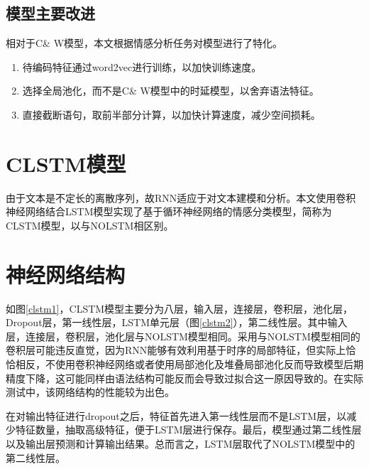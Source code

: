 \subsection{模型主要改进}
相对于C\& W模型，本文根据情感分析任务对模型进行了特化。
\begin{enumerate}
\item 待编码特征通过word2vec进行训练，以加快训练速度。
\item 选择全局池化，而不是C\& W模型中的时延模型，以舍弃语法特征。
\item 直接截断语句，取前半部分计算，以加快计算速度，减少空间损耗。
\end{enumerate}
\section{CLSTM模型}
由于文本是不定长的离散序列，故RNN适应于对文本建模和分析。本文使用卷积神经网络结合LSTM模型实现了基于循环神经网络的情感分类模型，简称为CLSTM模型，以与NOLSTM相区别。
\section{神经网络结构}
如图\ref{clstm1}，CLSTM模型主要分为八层，输入层，连接层，卷积层，池化层，Dropout层，第一线性层，LSTM单元层（图\ref{clstm2}），第二线性层。其中输入层，连接层，卷积层，池化层与NOLSTM模型相同。采用与NOLSTM模型相同的卷积层可能违反直觉，因为RNN能够有效利用基于时序的局部特征，但实际上恰恰相反，不使用卷积神经网络或者使用局部池化及堆叠局部池化反而导致模型后期精度下降，这可能同样由语法结构可能反而会导致过拟合这一原因导致的。在实际测试中，该网络结构的性能较为出色。\par
在对输出特征进行dropout之后，特征首先进入第一线性层而不是LSTM层，以减少特征数量，抽取高级特征，便于LSTM层进行保存。最后，模型通过第二线性层以及输出层预测和计算输出结果。总而言之，LSTM层取代了NOLSTM模型中的第二线性层。
